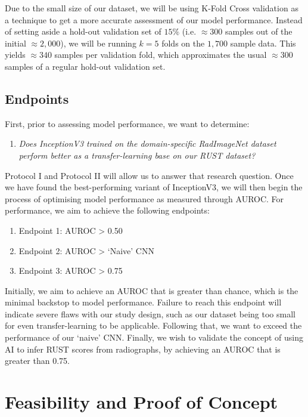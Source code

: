Due to the small size of our dataset, we will be using K-Fold Cross validation as a technique to get a more accurate assessment of our model performance. Instead of setting aside a hold-out validation set of \(15\%\) (i.e. \(\approx300\) samples out of the initial \(\approx 2,000\)), we will be running \(k=5\) folds on the \(1,700\) sample data. This yields \(\approx 340\) samples per validation fold, which approximates the usual \(\approx300\) samples of a regular hold-out validation set.

\subsection{Endpoints}
First, prior to assessing model performance, we want to determine:

\begin{enumerate}
    \item \emph{Does InceptionV3 trained on the domain-specific RadImageNet dataset perform better as a transfer-learning base on our RUST dataset?}
\end{enumerate}

\noindent
Protocol I and Protocol II will allow us to answer that research question. Once we have found the best-performing variant of InceptionV3, we will then begin the process of optimising model performance as measured through AUROC. For performance, we aim to achieve the following endpoints:

\begin{enumerate}
    \item Endpoint 1: AUROC > 0.50
    \item Endpoint 2: AUROC > \enquote*{Naive} CNN
    \item Endpoint 3: AUROC > 0.75
\end{enumerate}

\noindent
Initially, we aim to achieve an AUROC that is greater than chance, which is the minimal backstop to model performance. Failure to reach this endpoint will indicate severe flaws with our study design, such as our dataset being too small for even transfer-learning to be applicable. Following that, we want to exceed the performance of our \enquote*{naive} CNN. Finally, we wish to validate the concept of using AI to infer RUST scores from radiographs, by achieving an AUROC that is greater than 0.75.

\section{Feasibility and Proof of Concept}

